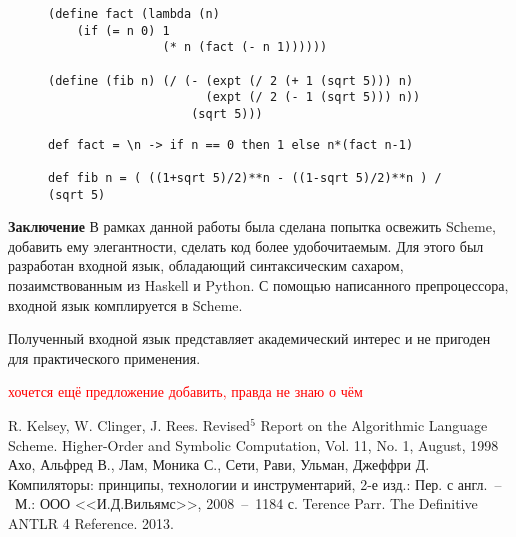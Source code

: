 \documentclass[12pt,a4paper,oneside]{extarticle}
\begin{document}
    \begin{figure}[h!]    
        \begin{lstlisting}[mathescape,label={lst:scheme},caption={Реализация функций fact и fib на Scheme},captionpos=b]
(define fact (lambda (n) 
    (if (= n 0) 1
                (* n (fact (- n 1))))))

(define (fib n) (/ (- (expt (/ 2 (+ 1 (sqrt 5))) n)
                      (expt (/ 2 (- 1 (sqrt 5))) n))
                    (sqrt 5)))
        \end{lstlisting}
    \end{figure}

    \begin{figure}[h!]  
        \begin{lstlisting}[mathescape,label={lst:lactose},caption={Реализация функций fact и fib на входном языке},captionpos=b]
def fact = \n -> if n == 0 then 1 else n*(fact n-1)

def fib n = ( ((1+sqrt 5)/2)**n - ((1-sqrt 5)/2)**n ) / (sqrt 5)

        \end{lstlisting}
    \end{figure}


\noindent\textbf{Заключение} 
    В рамках данной работы была сделана попытка освежить Sсheme, добавить ему элегантности, сделать код более удобочитаемым.
    Для этого был разработан входной язык, обладающий синтаксическим сахаром, позаимствованным из Haskell и Python.
    С помощью написанного препроцессора, входной язык комплируется в Sсheme.

    Полученный входной язык представляет академический интерес и не пригоден для практического применения.

    \textcolor{red}{хочется ещё предложение добавить, правда не знаю о чём}


\begin{thebibliography}{00}
     R. Kelsey, W. Clinger, J. Rees. Revised$^5$ Report on the Algorithmic Language Scheme. Higher-Order and Symbolic Computation, Vol. 11, No. 1, August, 1998
     Ахо, Альфред В., Лам, Моника С., Сети, Рави, Ульман, Джеффри Д. Компиляторы: принципы, технологии и инструментарий, 2-е изд.: Пер. с англ.~--~М.: ООО <<И.Д.Вильямс>>, 2008~--~1184 с.
     Terence Parr. The Definitive ANTLR 4 Reference. 2013.
\end{thebibliography}
\end{document}

